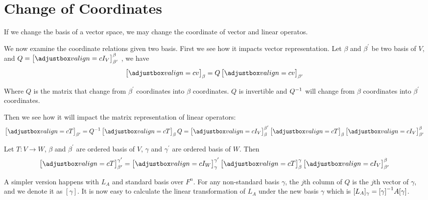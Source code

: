 %
%
%
%

\section{Change of Coordinates}

If we change the basis of a vector space, we may change the coordinate of vector and linear operatos.

We now examine the coordinate relations given two basis. First we see how it impacts vector representation. Let $\beta$ and $\beta^{\prime}$ be two basis of $V$, and $Q=\coordinate{I_V}_{\beta^\prime}^\beta$ , we have 
\begin{equation}
    \coordinate{v}_\beta = Q \coordinate{v}_{\beta^\prime}
\end{equation}

Where $Q$ is the  matrix that change from $\beta^\prime$ coordinates into $\beta$ coordinates. $Q$ is invertible and ${Q}^{-1}$ will change from $\beta$ coordinates into $\beta^\prime$ coordinates. 

Then we see how it will impact the matrix representation of linear operators:
\begin{equation}\label{change_of_coordinate_formula}
    \coordinate{T}_{\beta^\prime} = \inverse{Q} \coordinate{T}_{\beta} Q = \coordinate{I_V}_\beta^{\beta^\prime} \coordinate{T}_\beta \coordinate{I_V}_{\beta^\prime}^\beta
\end{equation}



\begin{theorem} \label{specialchangeofcoordinates}
	Let $T:V\rightarrow W$, $\beta$ and $\beta^\prime$ are ordered basis of $V$, $\gamma$ and $\gamma^\prime$ are ordered basis of $W$. Then
	\begin{equation}
		\coordinate{T}_{\beta^\prime}^{\gamma^\prime} = \coordinate{I_W}_\gamma^{\gamma^\prime} \coordinate{T}_\beta^\gamma \coordinate{I_V}_{\beta^\prime}^\beta
	\end{equation}
\end{theorem}


\begin{example}
    A simpler version happens with $L_A$ and standard basis over $F^n$. For any non-standard basis $\gamma$, the $j$th column of $Q$ is the $j$th vector of $\gamma$, and we denote it as $[\gamma]$. It is now easy to calculate the linear transformation of $L_A$ under the new basis $\gamma$ which is $[L_A]_\gamma = {[\gamma]}^{-1} A [\gamma]$.
\end{example}




